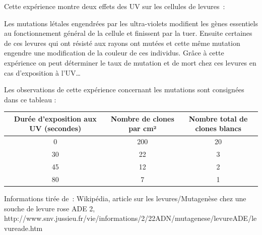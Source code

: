Cette expérience montre deux effets des UV sur les cellules de levures :

Les mutations létales engendrées par les ultra-violets modifient les gènes essentiels au fonctionnement général de la cellule et finissent par la tuer. Ensuite certaines de ces levures qui ont résisté aux rayons ont mutées et cette même mutation engendre une modification de la couleur de ces individus. Grâce à cette expérience on peut déterminer le taux de mutation et de mort chez ces levures en cas d’exposition à l’UV…

Les observations de cette expérience concernant les mutations sont consignées dans ce tableau : 

\begin{center}
	\begin{tabular}{ c | c | c  }
	   Durée d’exposition aux UV (secondes) & Nombre de clones par cm² & Nombre total de clones blancs \\ \hline \hline
	   0 & 200 & 20 \\ \hline
	   30 & 22 & 3 \\ \hline
	   45 & 12 & 2 \\ \hline
	   80 & 7 & 1
	\end{tabular}
\end{center}

Informations tirée de : Wikipédia, article sur les levures/Mutagenèse chez une souche de levure rose ADE 2, http://www.snv.jussieu.fr/vie/informations/2/22ADN/mutagenese/levureADE/levureade.htm
